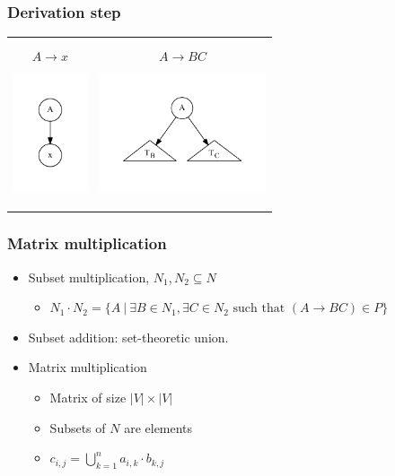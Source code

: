 \documentclass[xcolor=table]{beamer}
\begin{document}
\begin{frame}[fragile]
  \transwipe[direction=90]
  \frametitle{Derivation step}

  \begin{tabular}{p{4cm} p{6cm} }
   \begin{center}
      $$ A \rightarrow x $$      
      
      \includegraphics[height=3.5cm]{pictures/tree1.pdf}
    \end{center}
    &
    \begin{center}
      $$ A \rightarrow B C $$    
    
      \includegraphics[height=3.5cm]{pictures/tree2.pdf}
    \end{center} 
  \end{tabular}

\end{frame}
  
\begin{frame}
  \transwipe[direction=90]
  \frametitle{Matrix multiplication}
  \begin{itemize}
    \item Subset multiplication, $N_1, N_2 \subseteq N$
    \begin{itemize} 
      \item $N_1 \cdot N_2 = \{A~|~\exists B \in N_1, \exists C \in N_2 \text{ such that }(A \rightarrow B C) \in P\}$
    \end{itemize}
    \item Subset addition: set-theoretic union.
  \end{itemize}

  \begin{itemize}
    \item Matrix multiplication
    \begin{itemize}
      \item Matrix of size $|V| \times |V|$
      \item Subsets of $N$ are elements
      \item $c_{i,j} = \bigcup^{n}_{k=1}{a_{i,k} \cdot b_{k,j}}$
    \end{itemize}
  \end{itemize}
\end{frame}
\end{document}
